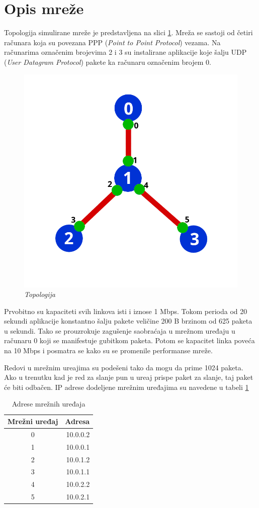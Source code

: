 \documentclass[a4paper, 12pt, projekat]{etf}
\begin{document}
	\section{Opis mreže}
	Topologija simulirane mreže je predstavljena na slici \ref{fig:topologija}. Mreža se sastoji od četiri računara koja su povezana PPP (\emph{Point to Point Protocol}) vezama. Na računarima označenim brojevima 2 i 3 su instalirane aplikacije koje šalju UDP (\emph{User Datagram Protocol}) pakete ka računaru označenim brojem 0. 
	\begin{figure}[htb]
		\centering
		\includegraphics[width=.6\textwidth]{../slike/topologija.png}
		\caption{\emph{Topologija}}
		\label{fig:topologija}
	\end{figure}
	
	Prvobitno su kapaciteti svih linkova isti i iznose 1\! Mbps.  Tokom perioda od 20 sekundi aplikacije konstantno šalju pakete veličine 200\! B brzinom od 625 paketa u sekundi. Tako se prouzrokuje zagušenje saobraćaja u mrežnom uređaju u računaru 0 koji se manifestuje gubitkom paketa. Potom se kapacitet linka poveća na 10\! Mbps i posmatra se kako su se promenile performanse mreže.
	
	
	Redovi u mre\v{z}nim ure\dj{}ajima su pode\v{s}eni tako da mogu da prime 1024 paketa. Ako u trenutku kad je red za slanje pun u ure\dj{}aj prispe paket za slanje, taj paket \'{c}e biti odba\v{c}en. IP adrese dodeljene mrežnim uređajima su navedene u tabeli \ref{tab:adr}
	\begin{table}[htb]
		\centering
		\caption{Adrese mrežnih uređaja}
		\label{tab:adr}
		\medskip
		\begin{tabular}{c|r}
			\hline
			Mrežni uređaj & Adresa \\
			\hline
			0 & 10.0.0.2 \\
			1 & 10.0.0.1 \\
			2 & 10.0.1.2 \\
			3 & 10.0.1.1 \\
			4 & 10.0.2.2 \\
			5 & 10.0.2.1
		\end{tabular}
	\end{table}
	
\end{document}
